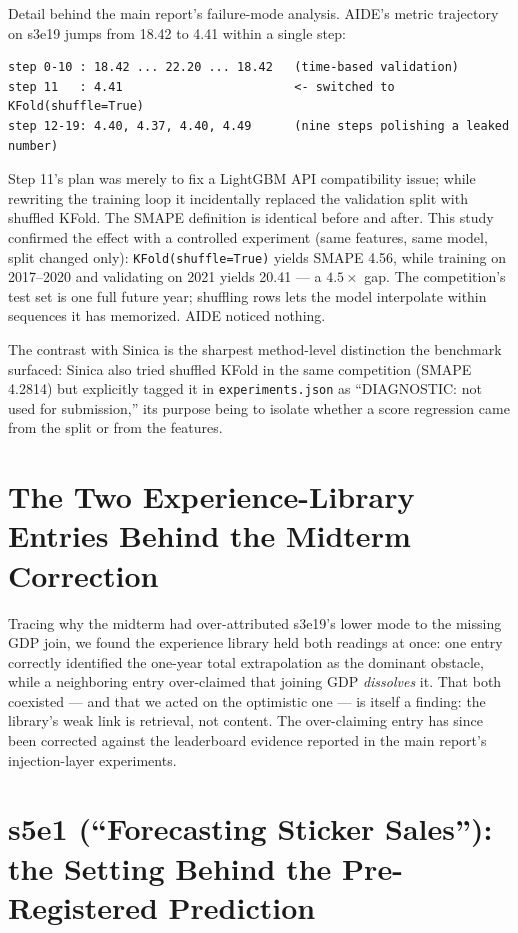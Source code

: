 \documentclass[11pt,a4paper]{article}
\begin{document}
Detail behind the main report's failure-mode analysis. AIDE's metric trajectory on s3e19 jumps
from 18.42 to 4.41 within a single step:

\begin{verbatim}
step 0-10 : 18.42 ... 22.20 ... 18.42   (time-based validation)
step 11   : 4.41                        <- switched to KFold(shuffle=True)
step 12-19: 4.40, 4.37, 4.40, 4.49      (nine steps polishing a leaked number)
\end{verbatim}

Step 11's plan was merely to fix a LightGBM API compatibility issue; while rewriting the
training loop it incidentally replaced the validation split with shuffled KFold. The SMAPE
definition is identical before and after. This study confirmed the effect with a controlled
experiment (same features, same model, split changed only): \texttt{KFold(shuffle=True)} yields
SMAPE 4.56, while training on 2017--2020 and validating on 2021 yields 20.41 --- a $4.5\times$
gap. The competition's test set is one full future year; shuffling rows lets the model
interpolate within sequences it has memorized. AIDE noticed nothing.

The contrast with Sinica is the sharpest method-level distinction the benchmark surfaced:
Sinica also tried shuffled KFold in the same competition (SMAPE 4.2814) but explicitly tagged
it in \texttt{experiments.json} as ``DIAGNOSTIC: not used for submission,'' its purpose being
to isolate whether a score regression came from the split or from the features.

\section{The Two Experience-Library Entries Behind the Midterm Correction}

Tracing why the midterm had over-attributed s3e19's lower mode to the missing GDP join, we
found the experience library held both readings at once: one entry correctly identified the
one-year total extrapolation as the dominant obstacle, while a neighboring entry over-claimed
that joining GDP \emph{dissolves} it. That both coexisted --- and that we acted on the
optimistic one --- is itself a finding: the library's weak link is retrieval, not content. The
over-claiming entry has since been corrected against the leaderboard evidence reported in the
main report's injection-layer experiments.

\section{s5e1 (``Forecasting Sticker Sales''): the Setting Behind the Pre-Registered Prediction}
\end{document}
